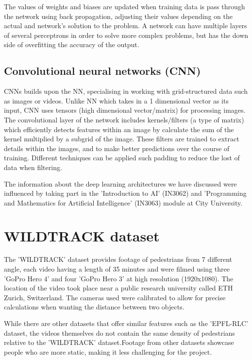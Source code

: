 \documentclass[12pt]{report}
\begin{document}
\vspace{5 mm}

The values of weights and biases are updated when training data is pass through the network using back propagation, adjusting their values depending on the actual and network's solution to the problem. A network can have multiple layers of several perceptrons in order to solve more complex problems, but has the down side of overfitting the accuracy of the output.


\subsection{Convolutional neural networks (CNN)}

CNNs builds upon the NN, specialising in working with grid-structured data such as images or videos. Unlike NN which takes in a 1 dimensional vector as its input, CNN uses tensors (high dimensional vector/matrix) for processing images. The convolutional layer of the network includes kernels/filters (a type of matrix) which efficiently detects features within an image by calculate the sum of the kernel multiplied by a subgrid of the image. These filters are trained to extract details within the images, and to make better predictions over the course of training. Different techniques can be applied such padding to reduce the lost of data when filtering.

The information about the deep learning architectures we have discussed were influenced by taking part in the 'Introduction to AI' (IN3062) and 'Programming and Mathematics for Artificial Intelligence' (IN3063) module at City University.

\section{WILDTRACK dataset}

The 'WILDTRACK' dataset provides footage of pedestrians from 7 different angle, each video having a length of 35 minutes and were filmed using three 'GoPro Hero 4' and four 'GoPro Hero 3' at high resolution (1920x1080). The location of the video took place near a public research university called ETH Zurich, Switzerland. The cameras used were calibrated to allow for precise calculations when wanting the distance between two objects.

While there are other datasets that offer similar features such as the 'EPFL-RLC' dataset, the videos themselves do not contain the same density of pedestrians relative to the 'WILDTRACK' dataset.Footage from other datasets showcase people who are more static, making it less challenging for the project.
\end{document}
